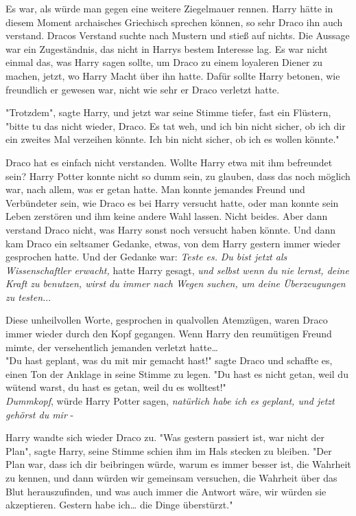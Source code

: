 {Es war, als würde man gegen eine weitere Ziegelmauer rennen. Harry hätte in diesem Moment archaisches Griechisch sprechen können, so sehr Draco ihn auch verstand. Dracos Verstand suchte nach Mustern und stieß auf nichts. Die Aussage war ein Zugeständnis, das nicht in Harrys bestem Interesse lag. Es war nicht einmal das, was Harry sagen sollte, um Draco zu einem loyaleren Diener zu machen, jetzt, wo Harry Macht über ihn hatte. Dafür sollte Harry betonen, wie freundlich er gewesen war, nicht wie sehr er Draco verletzt hatte.

"Trotzdem", sagte Harry, und jetzt war seine Stimme tiefer, fast ein Flüstern, "bitte tu das nicht wieder, Draco. Es tat weh, und ich bin nicht sicher, ob ich dir ein zweites Mal verzeihen könnte. Ich bin nicht sicher, ob ich es wollen könnte."

Draco hat es einfach nicht verstanden. Wollte Harry etwa mit ihm befreundet sein? Harry Potter konnte nicht so dumm sein, zu glauben, dass das noch möglich war, nach allem, was er getan hatte. Man konnte jemandes Freund und Verbündeter sein, wie Draco es bei Harry versucht hatte, oder man konnte sein Leben zerstören und ihm keine andere Wahl lassen. Nicht beides. Aber dann verstand Draco nicht, was Harry sonst noch versucht haben könnte. Und dann kam Draco ein seltsamer Gedanke, etwas, von dem Harry gestern immer wieder gesprochen hatte. Und der Gedanke war: \emph{Teste es.} \emph{Du bist jetzt als Wissenschaftler erwacht,} hatte Harry gesagt, \emph{und selbst wenn du nie lernst, deine Kraft zu benutzen, wirst du immer nach Wegen suchen, um deine Überzeugungen zu testen.}..

Diese unheilvollen Worte, gesprochen in qualvollen Atemzügen, waren Draco immer wieder durch den Kopf gegangen. Wenn Harry den reumütigen Freund mimte, der versehentlich jemanden verletzt hatte…\\ "Du hast geplant, was du mit mir gemacht hast!" sagte Draco und schaffte es, einen Ton der Anklage in seine Stimme zu legen. "Du hast es nicht getan, weil du wütend warst, du hast es getan, weil du es wolltest!"\\ \emph{Dummkopf}, würde Harry Potter sagen, \emph{natürlich habe ich es geplant, und jetzt gehörst du mir} -

Harry wandte sich wieder Draco zu. "Was gestern passiert ist, war nicht der Plan", sagte Harry, seine Stimme schien ihm im Hals stecken zu bleiben. "Der Plan war, dass ich dir beibringen würde, warum es immer besser ist, die Wahrheit zu kennen, und dann würden wir gemeinsam versuchen, die Wahrheit über das Blut herauszufinden, und was auch immer die Antwort wäre, wir würden sie akzeptieren. Gestern habe ich… die Dinge überstürzt."

}
